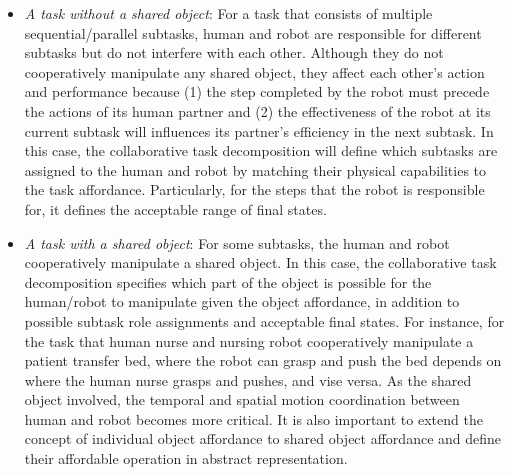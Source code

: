 \documentclass[letterpaper, 11 pt, onecolumn]{article}
\begin{document}
\begin{itemize}
\item {\it A task without a shared object}: For a task that consists of multiple sequential/parallel subtasks, human and robot are responsible for different subtasks but do not interfere with each other. Although they do not cooperatively manipulate any shared object, they affect each other's action and performance because (1) the step completed by the robot must precede the actions of its human partner and (2) the effectiveness of the robot at its current subtask %
will influences its partner's efficiency in the next subtask. %
In this case, the collaborative task decomposition will define which subtasks are assigned to the human and robot by matching their physical capabilities to the task affordance. Particularly, for the steps that the robot is responsible for, it defines the acceptable range of final states. %

\item {\it A task with a shared object}: For some subtasks, the human and robot cooperatively manipulate a shared object. In this case, the collaborative task decomposition specifies which part of the object is possible for the human/robot to manipulate given the object affordance, in addition to possible subtask role assignments and acceptable final states. %
For instance, for the task that human nurse and nursing robot cooperatively manipulate a patient transfer bed, where the robot can grasp and push the bed depends on where the human nurse grasps and pushes, and vise versa. As the shared object involved, the temporal and spatial motion coordination between human and robot becomes more critical. It is also important to extend the concept of individual object affordance to shared object affordance and define their affordable operation in abstract representation. 

\end{itemize}

\end{document}
